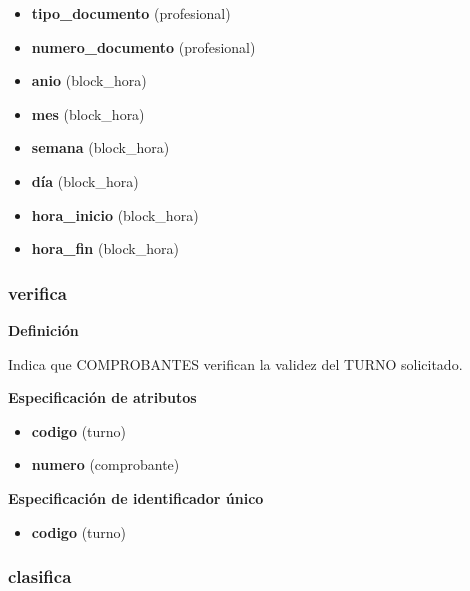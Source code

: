 \documentclass[a4paper,11pt]{article}
\begin{document}
\begin{itemize}

		\item \textbf{tipo\_documento} (profesional)

		\item \textbf{numero\_documento} (profesional)
		
		\item \textbf{anio} (block\_hora)

		\item \textbf{mes} (block\_hora)

		\item \textbf{semana} (block\_hora)

		\item \textbf{día} (block\_hora)

		\item \textbf{hora\_inicio} (block\_hora)

		\item \textbf{hora\_fin} (block\_hora)

\end{itemize}

\subsubsection{\textbf{verifica}}

\textbf{Definición}

Indica que COMPROBANTES verifican la validez del TURNO solicitado.

\textbf{Especificación de atributos}


\begin{itemize}

     \item \textbf{codigo} (turno)

     \item \textbf{numero} (comprobante)


\end{itemize}

\textbf{Especificación de identificador único}

\begin{itemize}

     \item \textbf{codigo} (turno)


\end{itemize}


\subsubsection{\textbf{clasifica}}
\end{document}
